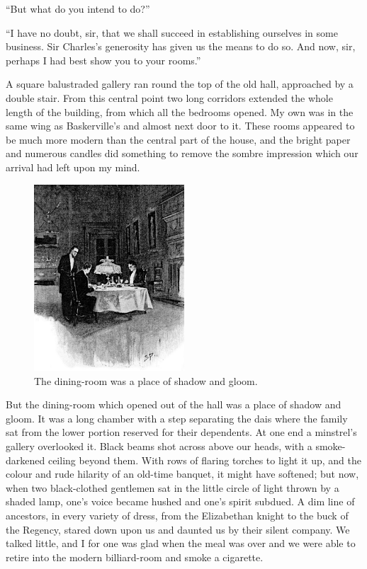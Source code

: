 \documentclass[paper=5.5in:8.5in,BCOR=7mm,twoside,DIV=calc,12pt,usegeometry,openany,chapterprefix,endperiod]{scrbook} %
\begin{document}
\enquote{But what do you intend to do?}

\enquote{I have no doubt, sir, that we shall succeed in establishing ourselves in some business. Sir Charles's generosity has given us the means to do so. And now, sir, perhaps I had best show you to your rooms.}

A square balustraded gallery ran round the top of the old hall, approached by a double stair. From this central point two long corridors extended the whole length of the building, from which all the bedrooms opened. My own was in the same wing as Baskerville's and almost next door to it. These rooms appeared to be much more modern than the central part of the house, and the bright paper and numerous candles did something to remove the sombre impression which our arrival had left upon my mind.
\begin{figure}
\centering
\includegraphics[width=0.5\textwidth]{06_diningroom}
\caption{The dining-room was a place of shadow and gloom.}
\end{figure}

But the dining-room which opened out of the hall was a place of shadow and gloom. It was a long chamber with a step separating the dais where the family sat from the lower portion reserved for their dependents. At one end a minstrel's gallery overlooked it. Black beams shot across above our heads, with a smoke-darkened ceiling beyond them. With rows of flaring torches to light it up, and the colour and rude hilarity of an old-time banquet, it might have softened; but now, when two black-clothed gentlemen sat in the little circle of light thrown by a shaded lamp, one's voice became hushed and one's spirit subdued. A dim line of ancestors, in every variety of dress, from the Elizabethan knight to the buck of the Regency, stared down upon us and daunted us by their silent company. We talked little, and I for one was glad when the meal was over and we were able to retire into the modern billiard-room and smoke a cigarette.
\end{document}
